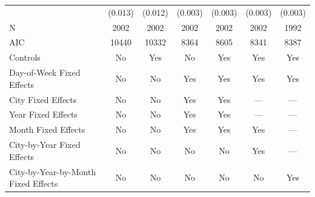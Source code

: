 \begin{table}
\begin{tabular}[t]{lcccccc}
\hspace{1em} & (0.013) & (0.012) & (0.003) & (0.003) & (0.003) & (0.003)\\
\hspace{1em}N & 2002 & 2002 & 2002 & 2002 & 2002 & 1992\\
\hspace{1em}AIC & 10440 & 10332 & 8364 & 8605 & 8341 & 8387\\
Controls & No & Yes & No & Yes & Yes & Yes\\
Day-of-Week Fixed Effects & No & No & Yes & Yes & Yes & Yes\\
City Fixed Effects & No & No & Yes & Yes & — & —\\
Year Fixed Effects & No & No & Yes & Yes & — & —\\
Month Fixed Effects & No & No & Yes & Yes & Yes & —\\
City-by-Year Fixed Effects & No & No & No & No & Yes & —\\
City-by-Year-by-Month Fixed Effects & No & No & No & No & No & Yes\\
\bottomrule
\end{tabular}
\end{table}
